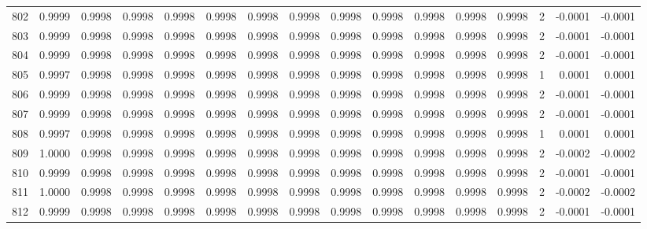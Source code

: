 \begin{tabular}{lrrrrrrrrrrrrrrr}
802 &      0.9999 &  0.9998 &  0.9998 &  0.9998 &  0.9998 &  0.9998 &  0.9998 &  0.9998 &  0.9998 &  0.9998 &   0.9998 &     0.9998 &      2 &                   -0.0001 &                    -0.0001 \\
803 &      0.9999 &  0.9998 &  0.9998 &  0.9998 &  0.9998 &  0.9998 &  0.9998 &  0.9998 &  0.9998 &  0.9998 &   0.9998 &     0.9998 &      2 &                   -0.0001 &                    -0.0001 \\
804 &      0.9999 &  0.9998 &  0.9998 &  0.9998 &  0.9998 &  0.9998 &  0.9998 &  0.9998 &  0.9998 &  0.9998 &   0.9998 &     0.9998 &      2 &                   -0.0001 &                    -0.0001 \\
805 &      0.9997 &  0.9998 &  0.9998 &  0.9998 &  0.9998 &  0.9998 &  0.9998 &  0.9998 &  0.9998 &  0.9998 &   0.9998 &     0.9998 &      1 &                    0.0001 &                     0.0001 \\
806 &      0.9999 &  0.9998 &  0.9998 &  0.9998 &  0.9998 &  0.9998 &  0.9998 &  0.9998 &  0.9998 &  0.9998 &   0.9998 &     0.9998 &      2 &                   -0.0001 &                    -0.0001 \\
807 &      0.9999 &  0.9998 &  0.9998 &  0.9998 &  0.9998 &  0.9998 &  0.9998 &  0.9998 &  0.9998 &  0.9998 &   0.9998 &     0.9998 &      2 &                   -0.0001 &                    -0.0001 \\
808 &      0.9997 &  0.9998 &  0.9998 &  0.9998 &  0.9998 &  0.9998 &  0.9998 &  0.9998 &  0.9998 &  0.9998 &   0.9998 &     0.9998 &      1 &                    0.0001 &                     0.0001 \\
809 &      1.0000 &  0.9998 &  0.9998 &  0.9998 &  0.9998 &  0.9998 &  0.9998 &  0.9998 &  0.9998 &  0.9998 &   0.9998 &     0.9998 &      2 &                   -0.0002 &                    -0.0002 \\
810 &      0.9999 &  0.9998 &  0.9998 &  0.9998 &  0.9998 &  0.9998 &  0.9998 &  0.9998 &  0.9998 &  0.9998 &   0.9998 &     0.9998 &      2 &                   -0.0001 &                    -0.0001 \\
811 &      1.0000 &  0.9998 &  0.9998 &  0.9998 &  0.9998 &  0.9998 &  0.9998 &  0.9998 &  0.9998 &  0.9998 &   0.9998 &     0.9998 &      2 &                   -0.0002 &                    -0.0002 \\
812 &      0.9999 &  0.9998 &  0.9998 &  0.9998 &  0.9998 &  0.9998 &  0.9998 &  0.9998 &  0.9998 &  0.9998 &   0.9998 &     0.9998 &      2 &                   -0.0001 &                    -0.0001 \\

\end{tabular}
